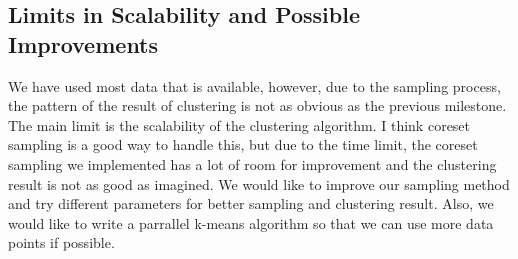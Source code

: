\subsection{Limits in Scalability and Possible Improvements}
We have used most data that is available, however, due to the sampling process, the pattern of the result of clustering is not as obvious as the previous milestone. The
main limit is the scalability of the clustering algorithm. I think coreset sampling is a good way to handle this, but due to the time limit, the coreset sampling we implemented has a lot of room for improvement and the clustering result is not as good as imagined. We would like to improve our sampling method and try different parameters for better sampling and clustering result. Also, we would like to write a parrallel k-means algorithm so that we can use more data points if possible.
